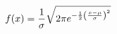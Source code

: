 \documentclass[preview]{standalone}
\begin{document}
\begin{align*}
f(x)=\frac{1} \sigma} \sqrt{2 \pi  e^{-\frac{1}{2}\left(\frac{x-\mu}{\sigma}\right)^2}
\end{align*}
\end{document}

